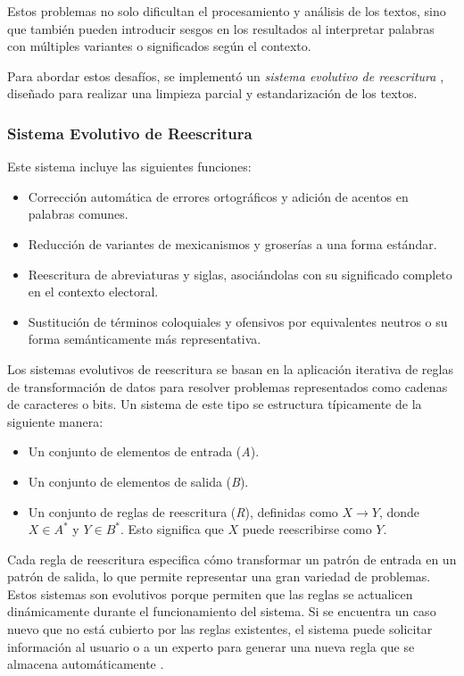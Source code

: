 \documentclass[10pt, a4paper]{article}
\begin{document}
	Estos problemas no solo dificultan el procesamiento y análisis de los textos, sino que también pueden introducir sesgos en los resultados al interpretar palabras con múltiples variantes o significados según el contexto.
	
	Para abordar estos desafíos, se implementó un \textit{sistema evolutivo de reescritura} \parencite{galindo1991sistemas}, diseñado para realizar una limpieza parcial y estandarización de los textos. 
	
	\subsubsection{Sistema Evolutivo de Reescritura}
	
	Este sistema incluye las siguientes funciones:
	\begin{itemize}
		\item Corrección automática de errores ortográficos y adición de acentos en palabras comunes.
		\item Reducción de variantes de mexicanismos y groserías a una forma estándar.
		\item Reescritura de abreviaturas y siglas, asociándolas con su significado completo en el contexto electoral.
		\item Sustitución de términos coloquiales y ofensivos por equivalentes neutros o su forma semánticamente más representativa.
	\end{itemize}
	
	Los sistemas evolutivos de reescritura se basan en la aplicación iterativa de reglas de transformación de datos para resolver problemas representados como cadenas de caracteres o bits. Un sistema de este tipo se estructura típicamente de la siguiente manera:
	
	\begin{itemize}
		\item Un conjunto de elementos de entrada (\textit{A}).
		\item Un conjunto de elementos de salida (\textit{B}).
		\item Un conjunto de reglas de reescritura (\textit{R}), definidas como $X \rightarrow Y$, donde $X \in A^*$ y $Y \in B^*$. Esto significa que $X$ puede reescribirse como $Y$.
	\end{itemize}
	
	Cada regla de reescritura especifica cómo transformar un patrón de entrada en un patrón de salida, lo que permite representar una gran variedad de problemas. Estos sistemas son evolutivos porque permiten que las reglas se actualicen dinámicamente durante el funcionamiento del sistema. Si se encuentra un caso nuevo que no está cubierto por las reglas existentes, el sistema puede solicitar información al usuario o a un experto para generar una nueva regla que se almacena automáticamente \parencite{galindo1991sistemas}.
	
\end{document}
